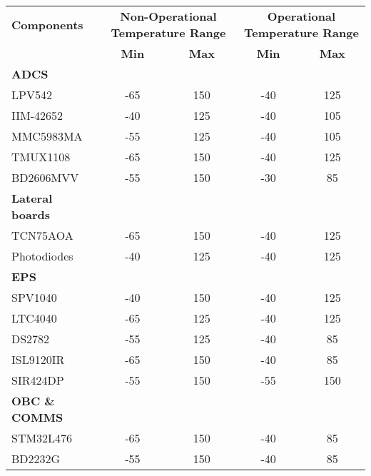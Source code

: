 \begin{table}[H]
  \centering
  \begin{tabular}{lcccc}
  \toprule
  \textbf{Components} & \multicolumn{2}{c}{\textbf{Non-Operational Temperature Range}} & \multicolumn{2}{c}{\textbf{Operational Temperature Range}} \\ 
  \cmidrule(lr){2-3} \cmidrule(lr){4-5}
                      & \textbf{Min} & \textbf{Max} & \textbf{Min} & \textbf{Max} \\ 
  \midrule
  \textbf{ADCS} & & & & \\
  \midrule
  LPV542              & -65          & 150          & -40          & 125          \\ 
  IIM-42652           & -40          & 125          & -40          & 105          \\ 
  MMC5983MA           & -55          & 125          & -40          & 105          \\ 
  TMUX1108            & -65          & 150          & -40          & 125          \\ 
  BD2606MVV           & -55          & 150          & -30          & 85           \\ 
  \midrule
  \textbf{Lateral boards} & & & & \\
  \midrule
  TCN75AOA            & -65          & 150          & -40          & 125          \\ 
  Photodiodes          & -40          & 125          & -40          & 125          \\ 
  \midrule
  \textbf{EPS} & & & & \\
  \midrule
  SPV1040             & -40          & 150          & -40          & 125          \\ 
  LTC4040             & -65          & 125          & -40          & 125          \\ 
  DS2782              & -55          & 125          & -40          & 85           \\ 
  ISL9120IR           & -65          & 150          & -40          & 85           \\ 
  SIR424DP            & -55          & 150          & -55          & 150          \\ 
  \midrule
  \textbf{OBC \& COMMS} & & & & \\
  \midrule
  STM32L476           & -65          & 150          & -40          & 85           \\ 
  BD2232G             & -55          & 150          & -40          & 85           \\ 

\end{tabular}
\end{table}
